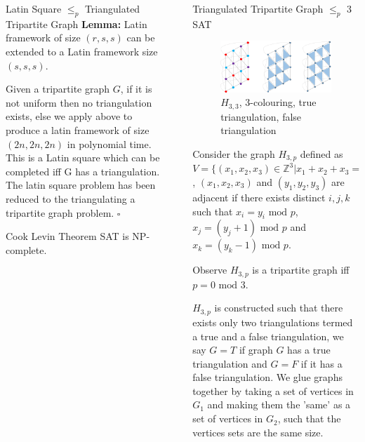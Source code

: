 \documentclass[final]{beamer}
\newlength{\sepwidth}
\newlength{\colwidth}
\newcounter{col}
\newcommand{\separatorcolumn}{\begin{column}{\sepwidth}\end{column}}
\begin{document}
\begin{frame}[t]
\begin{columns}[t]
\begin{column}{\colwidth}
\begin{block}{Latin Square $\leq_p$ Triangulated Tripartite Graph}
\textbf{Lemma:} Latin framework of size $(r,s,s)$ can be extended to a Latin framework size $(s,s,s)$.

Given a tripartite graph $G$, if it is not uniform then no triangulation exists, else we apply above to produce a latin framework of size $(2n,2n,2n)$ in polynomial time. This is a Latin square which can be completed iff G has a triangulation. The latin square problem has been reduced to the triangulating a tripartite graph problem. $\square$

  \end{block}
  \begin{alertblock}{Cook Levin Theorem}
SAT is NP-complete.
  \end{alertblock}
\end{column}

\separatorcolumn

\begin{column}{\colwidth}
  \begin{block}{Triangulated Tripartite Graph $\leq_p$ 3 SAT}

\begin{figure}
		\includegraphics[width=70mm]{holyer_graph.png}
		\caption{$H_{3,3}$, 3-colouring, true triangulation, false triangulation}
\end{figure}

Consider the graph $H_{3,p}$ defined as $V=\{(x_1,x_2,x_3)\in \mathbb{Z}^3|x_1+x_2+x_3=0\text{ mod }p \}$, $(x_1,x_2,x_3)$ and $(y_1,y_2,y_3)$ are adjacent if there exists distinct $i,j,k$ such that $x_i=y_i \text{ mod }p $, $x_j=(y_j+1) \text{ mod }p $ and $x_k=(y_k-1) \text{ mod }p $.

Observe $H_{3,p}$ is a tripartite graph iff $p=0 \text{ mod }3$.

$H_{3,p}$ is constructed such that there exists only two triangulations termed a true and a false triangulation, we say $G=T$ if graph $G$ has a true triangulation and $G=F$ if it has a false triangulation. We glue graphs together by taking a set of vertices in $G_1$ and making them the 'same' as a set of vertices in $G_2$, such that the vertices sets are the same size.


\end{block}
\end{column}
\end{columns}
\end{frame}
\end{document}
